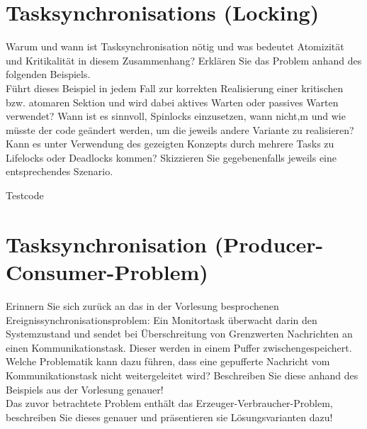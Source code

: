 \documentclass[12pt,a4paper,ngerman]{article}
\begin{document}


%
%

\section*{Tasksynchronisations (Locking)}


\begin{framed}
Warum und wann ist Tasksynchronisation nötig und was bedeutet Atomizität und Kritikalität in diesem Zusammenhang?
Erklären Sie das Problem anhand des folgenden Beispiels. \\
Führt dieses Beispiel in jedem Fall zur korrekten Realisierung einer kritischen bzw. atomaren Sektion und wird dabei aktives Warten oder passives Warten verwendet?
Wann ist es sinnvoll, Spinlocks einzusetzen, wann nicht,m und wie müsste der code geändert werden, um die jeweils andere Variante zu realisieren? \\
Kann es unter Verwendung des gezeigten Konzepts durch mehrere Tasks zu Lifelocks oder Deadlocks kommen? Skizzieren Sie gegebenenfalls jeweils eine entsprechendes Szenario.
\end{framed}

Testcode





\pagebreak
\section*{Tasksynchronisation (Producer-Consumer-Problem)}


\begin{framed}
Erinnern Sie sich zurück an das in der Vorlesung besprochenen Ereignissynchronisationsproblem: Ein Monitortask überwacht darin den Systemzustand und sendet bei Überschreitung von Grenzwerten Nachrichten an einen Kommunikationstask. Dieser werden in einem Puffer zwischengespeichert. \\
Welche Problematik kann dazu führen, dass eine gepufferte Nachricht vom Kommunikationstask nicht weitergeleitet wird? Beschreiben Sie diese anhand des Beispiels aus der Vorlesung genauer!\\
Das zuvor betrachtete Problem enthält das Erzeuger-Verbraucher-Problem, beschreiben Sie dieses genauer und präsentieren sie Lösungsvarianten dazu!
\end{framed}
\end{document}
